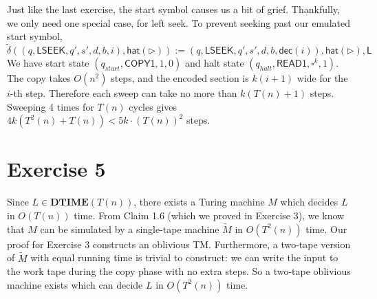 \documentclass[12pt]{article}
\begin{document}
Just like the last exercise, the start symbol causes us a bit of grief. Thankfully, we only need one special case, for left seek. To prevent seeking past our emulated start symbol,
$$
\tilde{\delta}((q, \textsf{LSEEK}, q', s', d, b, i), \textsf{hat}(\triangleright)) := (q, \textsf{LSEEK}, q', s', d, b, \textsf{dec}(i)), \textsf{hat}(\triangleright), \textsf{L}
$$
We have start state $(q_{start}, \textsf{COPY1}, 1, 0)$ and halt state $(q_{halt}, \textsf{READ1}, \square^k, 1)$. The copy takes $O(n^2)$ steps, and the encoded section is $k(i+1)$ wide for the $i$-th step. Therefore each sweep can take no more than $k(T(n) + 1)$ steps. Sweeping 4 times for $T(n)$ cycles gives $4k(T^2(n) + T(n)) < 5k \cdot (T(n))^2$ steps.

\section*{Exercise 5}


Since $L \in \textbf{DTIME}(T(n))$, there exists a Turing machine $M$ which decides $L$ in $O(T(n))$ time. From Claim 1.6 (which we proved in Exercise 3), we know that $M$ can be simulated by a single-tape machine $\tilde{M}$ in $O(T^2(n))$ time. Our proof for Exercise 3 constructs an oblivious TM. Furthermore, a two-tape version of $\tilde{M}$ with equal running time is trivial to construct: we can write the input to the work tape during the copy phase with no extra steps. So a two-tape oblivious machine exists which can decide $L$ in $O(T^2(n))$ time.
\end{document}
